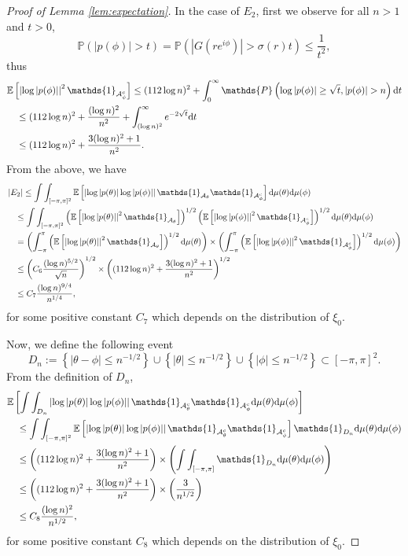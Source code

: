 \documentclass[12pt]{amsart}
\theoremstyle{plain}
\numberwithin{equation}{section}
\renewcommand{\Pr}{\mathbb{P}}
\newcommand{\<}{\langle}
\renewcommand{\>}{\rangle}
\newcommand{\PP}[1]{\left(#1\right)}
\newcommand{\LL}[1]{\left\{#1\right\}}
\newcommand{\dd}{\textnormal{d}}
\newcommand{\E}[2][ ]{\mathbb{E}{#1}\left[#2\right]}
\newcommand{\abs}[1]{\left|#1\right|}
\renewcommand{\Pr}[1]{\mathds{P}\left(#1\right)}
\begin{document}
\begin{proof}[Proof of Lemma \ref{lem:expectation}]
In the case of $E_2$, first we observe for all $n>1$ and $t>0$,
\[
\Pr{\abs{p(\phi)} > t} = \Pr{\abs{G(re^{i\phi})} > \sigma(r) t } \leq \frac{1}{t^2},
\]
thus
\begin{align*}
& \E{\abs{\log\abs{p(\phi)}}^2 \mathds{1}_{ \mathcal{A}_{\phi}^c} } \leq (112 \log n)^2 + \int_{0}^\infty \Pr{ \log\abs{p(\phi)} \geq \sqrt{t}, \abs{p(\phi)} > n } \dd t \\
& \quad \leq (112 \log n)^2 + \frac{(\log n)^2}{n^2} + \int_{(\log n)^2}^{\infty} e^{-2\sqrt{t}} \dd t \\
& \quad \leq (112 \log n)^2 + \frac{3(\log n)^2 + 1}{n^2}. 
\end{align*}
From the above, we have
\begin{align*}
& \abs{E_2}  \leq \int\int_{[-\pi,\pi]^2}\E{ \abs{\log\abs{p(\theta)} \log\abs{p(\phi)}} \mathds{1}_{\mathcal{A}_\theta} \mathds{1}_{\mathcal{A}_{\phi}^c} } \dd\mu(\theta) \dd\mu(\phi) \\
& \quad \leq \int\int_{[-\pi,\pi]^2} \PP{\E{\abs{\log\abs{p(\theta)}}^2 \mathds{1}_{\mathcal{A}_{\theta}}}}^{1/2} \PP{\E{\abs{\log\abs{p(\phi)}}^2 \mathds{1}_{\mathcal{A}_{\phi}^c}}}^{1/2} \dd\mu(\theta) \dd\mu(\phi) \\
& \quad = \PP{\int_{-\pi}^{\pi} \PP{\E{\abs{\log\abs{p(\theta)}}^2 \mathds{1}_{\mathcal{A}_{\theta}}}}^{1/2} \dd\mu(\theta) } \times \PP{ \int_{-\pi}^{\pi}  \PP{\E{\abs{\log\abs{p(\phi)}}^2 \mathds{1}_{\mathcal{A}_{\phi}^c}}}^{1/2} \dd\mu(\phi)} \\
& \quad \leq \PP{C_6 \frac{(\log n)^{5/2}}{\sqrt{n}}}^{1/2} \times \PP{(112 \log n)^2 +\frac{3(\log n)^2 + 1}{n^2}}^{1/2} \\
& \quad \leq C_7 \frac{(\log n)^{9/4}}{n^{1/4}},
\end{align*}
for some positive constant $C_7$ which depends on the distribution of $\xi_0$.

Now, we define the following event 
\[
D_n := \LL{ \abs{\theta - \phi}\leq n^{-1/2}} \cup \LL{\abs{\theta}\leq n^{-1/2}} \cup \LL{\abs{\phi}\leq n^{-1/2}} \subset [-\pi,\pi]^2.
\]
From the definition of $D_n$, 
\begin{align*}
& \E{ \int\int_{D_n} \abs{\log\abs{p(\theta)} \log\abs{p(\phi)}} \mathds{1}_{\mathcal{A}_{\theta}^c} \mathds{1}_{\mathcal{A}_\phi^c} \dd\mu(\theta) \dd\mu(\phi) } \\
& \quad \leq \int\int_{[-\pi,\pi]^2}\E{ \abs{\log\abs{p(\theta)} \log\abs{p(\phi)}} \mathds{1}_{\mathcal{A}_{\theta}^c} \mathds{1}_{\mathcal{A}_{\phi}^c} }  \mathds{1}_{D_n} \dd\mu(\theta) \dd\mu(\phi) \\
& \quad \leq \PP{(112 \log n)^2 + \frac{3(\log n)^2 + 1}{n^2}} \times \PP{ \int\int_{[-\pi,\pi]} \mathds{1}_{D_n} \dd\mu(\theta) \dd\mu(\phi)} \\
& \quad \leq \PP{(112 \log n)^2 +\frac{3(\log n)^2 + 1}{n^2}} \times \PP{\frac{3}{n^{1/2}}}\\
& \quad \leq C_8 \frac{(\log n)^2}{n^{1/2}},
\end{align*}
for some positive constant $C_8$ which depends on the distribution of $\xi_0$.


\end{proof}
\end{document}
